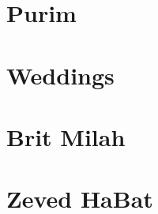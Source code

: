 \documentclass[letterpaper]{memoir}
\newcommand{\song}[2]{}
\begin{document}
\chapter{Purim}
\song{Ronu Gilu}{Ronu_Gilu.pdf}
\song{Or Gilah}{Or_Gilah.pdf} %
\song{El Melech Ne'eman}{El_Melech_Neeman.pdf}
\song{Ezer Mitzarai}{Ezer_Mitzarai.pdf}
\song{Simeni Rosh}{Simeni_Rosh.pdf}
\song{Chish Misgabi Geulah}{Chish_Misgabi_Geulah.pdf}
\song{Eli Tzur Yishuati}{Eli_Tzur_Yishuati.pdf}

\chapter{Weddings}
\song{Yismach Hatani}{Yismach_Hatani.pdf}
\song{El Me'od Na'alah}{El_Meod_Naalah.pdf}
\song{Im Chacham Libecha Beni}{Im_Chacham_Libecha_Beni.pdf}
\song{Makhelot Am}{Makhelot_Am.pdf}
\song{Ya'alah Ya'alah}{Yaalah_Yaalah.pdf}
\song{Et Dodim Kalah}{Et_Dodim_Kalah.pdf}

\chapter{Brit Milah}
\song{Mah Tov Mah Na'im}{Mah_Tov_Mah_Naim.pdf}
\song{Yehi Shalom b'Cheleinu (Yerushalmi)}{Yehi_Shalom_bCheleinu_Yerushalmi.pdf}
\song{Yehi Shalom B'Cheleinu (Syrian)}{Yehi_Shalom_bCheleinu_Syrian.pdf}
\song{Atah Ahuvi}{Atah_Ahuvi.pdf}

\chapter{Zeved HaBat}
\song{Nava Yafa Tz'viyah}{Nava_Yafa_Tzviyah.pdf}
\song{Yifat Ayin}{Yifat_Ayin.pdf}
\end{document}
